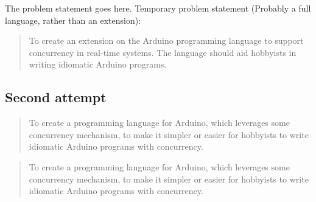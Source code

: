 The problem statement goes here. Temporary problem statement (Probably a full language, rather than an extension):

\blockquote{To create an extension on the Arduino programming language to support concurrency in real-time systems. The language should aid hobbyists in writing idiomatic Arduino programs.}

\subsection{Second attempt}

\blockquote{To create a programming language for Arduino, which leverages some concurrency mechanism, to make it simpler or easier for hobbyists to write idiomatic Arduino programs with concurrency.}


\blockquote{To create a programming language for Arduino, which leverages some concurrency mechanism, to make it simpler or easier for hobbyists to write idiomatic Arduino programs with concurrency.}